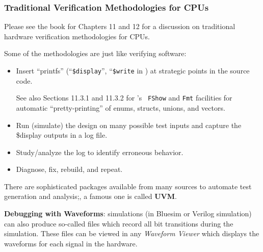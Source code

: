 \begin{frame}[fragile]
\frametitle{Traditional Verification Methodologies for CPUs}

\begin{center}\scriptsize
 
 \vspace*{5ex}

 \begin{minipage}{0.9\textwidth}\scriptsize

    Please see the book for Chapters 11 and 12 for a discussion on
    traditional hardware verification methodologies for CPUs.

    \vspace*{2ex}

    Some of the methodologies are just like verifying software:
    \begin{itemize}

      \item Insert ``printfs'' (``{\tt \$display}'', ``{\tt \$write}
            in {\BSV}) at strategic points in the source code.

            \vspace*{1ex}

            See also Sections 11.3.1 and 11.3.2 for {\BSV}'s {\tt
            FShow} and {\tt Fmt} facilities for automatic
            ``pretty-printing'' of enums, structs, unions, and vectors.

      \item Run (simulate) the design on many possible test inputs and
            capture the {\$display} outputs in a log file.

      \item Study/analyze the log to identify erroneous behavior.

      \item Diagnose, fix, rebuild, and repeat.
    \end{itemize}

    There are sophisticated packages available from many sources to
    automate test generation and analysis;, a famous one is called
    {\bf UVM}.

    \vspace*{4ex}

    {\bf Debugging with Waveforms}: {\BSV} simulations (in Bluesim or
    Verilog simulation) can also produce so-called {\VCD} files which
    record all bit transitions during the simulation.  These {\VCD}
    files can be viewed in any \emph{Waveform Viewer} which displays
    the waveforms for each signal in the hardware.


\end{minipage}
\end{center}
\end{frame}
